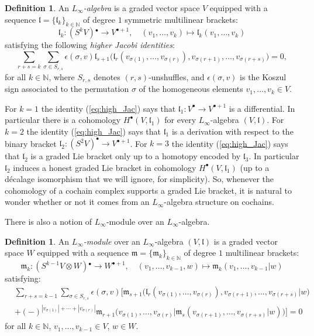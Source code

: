 \documentclass{conm-p-l}
\theoremstyle{definition}
\newtheorem{definition}[theorem]{Definition}
\theoremstyle{remark}
\numberwithin{equation}{section}
\begin{document}
\begin{definition}
An \emph{$L_\infty$-algebra} \cite{ls93, lm95} is a graded vector space $V$ equipped with a sequence $\mathfrak l = \{ \mathfrak l_k \}_{k \in \mathbb N}$ of degree $1$ symmetric multilinear brackets:
\[
\mathfrak l_k : \left(S^k V\right){}^\bullet \to V^{\bullet +1}, \quad (v_1, \ldots, v_{k}) \mapsto \mathfrak l_k (v_1, \ldots, v_{k})
\]
satisfying the following \emph{higher Jacobi identities}:
\begin{equation}\label{eq:high_Jac}
\sum_{r+s = k} \sum_{\sigma \in S_{r, s}}\epsilon (\sigma , v) \mathfrak l_{s+1} \big(\mathfrak l_r (v_{\sigma(1)}, \ldots, v_{\sigma(r)}), v_{\sigma (r+1)}, \ldots, v_{\sigma (r+s)}\big) = 0,
\end{equation}
for all $k \in \mathbb N$, where $S_{r,s}$ denotes $(r,s)$-unshuffles, and $\epsilon (\sigma, v)$ is the Koszul sign associated to the permutation $\sigma$ of the homogeneous elements $v_1, \ldots, v_k \in V$.
\end{definition}

For $k = 1$ the identity (\ref{eq:high_Jac}) says that $\mathfrak l_1 : V^\bullet \to V^{\bullet +1}$ is a differential. In particular there is a cohomology $H^\bullet (V, \mathfrak l_1)$ for every $L_\infty$-algebra $(V , \mathfrak l)$. For $k = 2$ the identity (\ref{eq:high_Jac}) says that $\mathfrak l_1$ is a derivation with respect to the binary bracket $\mathfrak l_2 : (S^2 V)^\bullet \to V^{\bullet +1}$. For $k = 3$ the identity (\ref{eq:high_Jac}) says that $\mathfrak l_2$ is a graded Lie bracket only up to a homotopy encoded by $\mathfrak l_3$. In particular $\mathfrak l_2$ induces a honest graded Lie bracket in cohomology $H^\bullet (V, \mathfrak l_1)$ (up to a d\'ecalage isomorphism that we will ignore, for simplicity). So, whenever the cohomology of a cochain complex supports a graded Lie bracket, it is natural to wonder whether or not it comes from an $L_\infty$-algebra structure on cochains.

There is also a notion of $L_\infty$-module over an $L_\infty$-algebra.

\begin{definition}
An \emph{$L_\infty$-module} \cite{lm95} over an $L_\infty$-algebra $(V, \mathfrak l)$ is a graded vector space $W$ equipped with a sequence $\mathfrak m = \{ \mathfrak m_k \}_{k \in \mathbb N}$ of degree $1$ multilinear brackets:
\[
\mathfrak m_k : \left(S^{k-1} V \otimes W \right){}^\bullet \to W^{\bullet + 1}, \quad (v_1, \ldots, v_{k-1}, w) \mapsto \mathfrak m_k (v_1, \ldots, v_{k-1}| w)
\]
satisfying:
\[
\begin{aligned}
& \sum_{r+s = k-1} \sum_{\sigma \in S_{r, s}}\epsilon (\sigma , v) \Big[\mathfrak m_{s+1} \big(\mathfrak l_r (v_{\sigma(1)}, \ldots, v_{\sigma(r)}), v_{\sigma (r+1)}, \ldots, v_{\sigma (r+s)}| w \big)  \\
& + (-)^{|v_{\sigma(1)}| + \cdots +|v_{\sigma(r)}|} \mathfrak m_{r+1} \big( v_{\sigma (1)}, \ldots, v_{\sigma (r)}| \mathfrak m_s (v_{\sigma(r+1)}, \ldots, v_{\sigma(r+s)}|w)\big) \Big]= 0
\end{aligned}
\]
for all $k \in \mathbb N$, $v_1, \ldots, v_{k-1} \in V$, $w \in W$.
\end{definition}
\end{document}
